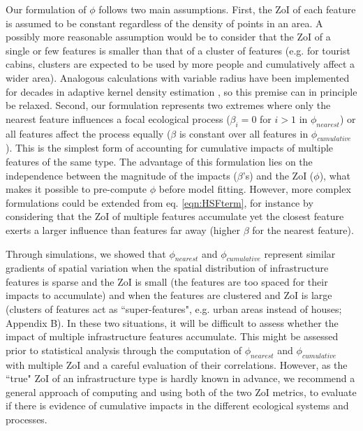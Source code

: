 \documentclass[titlepage]{article}
\begin{document}
Our formulation of $\phi$ follows two main assumptions. First, the ZoI of each feature is assumed to be constant regardless of the density of points in an area. A possibly more reasonable assumption would be to consider that the ZoI of a single or few features is smaller than that of a cluster of features (e.g. for tourist cabins, clusters are expected to be used by more people and cumulatively affect a wider area). Analogous calculations with variable radius have been implemented for decades in adaptive kernel density estimation \citep{worton_kernel_1989}, so this premise can in principle be relaxed. Second, our formulation represents two extremes where only the nearest feature influences a focal ecological process ($\beta_i = 0$ for $i > 1$ in $\phi_{nearest}$) or all features affect the process equally ($\beta$ is constant over all features in $\phi_{cumulative}$). This is the simplest form of accounting for cumulative impacts of multiple features of the same type. The advantage of this formulation lies on the independence between the magnitude of the impacts ($\beta$'s) and the ZoI ($\phi$), what makes it possible to pre-compute $\phi$ before model fitting. However, more complex formulations could be extended from eq. \ref{eqn:HSFterm}, for instance by considering that the ZoI of multiple features accumulate yet the closest feature exerts a larger influence than features far away (higher $\beta$ for the nearest feature).

Through simulations, we showed that $\phi_{nearest}$ and $\phi_{cumulative}$ represent similar gradients of spatial variation when the spatial distribution of infrastructure features is sparse and the ZoI is small (the features are too spaced for their impacts to accumulate) and when the features are clustered and ZoI is large (clusters of features act as ``super-features", e.g. urban areas instead of houses; Appendix B). In these two situations, it will be difficult to assess whether the impact of multiple infrastructure features accumulate. This might be assessed prior to statistical analysis through the computation of $\phi_{nearest}$ and $\phi_{cumulative}$ with multiple ZoI and a careful evaluation of their correlations. However, as the ``true" ZoI of an infrastructure type is hardly known in advance, we recommend a general approach of computing and using both of the two ZoI metrics, to evaluate if there is evidence of cumulative impacts in the different ecological systems and processes.
\end{document}
